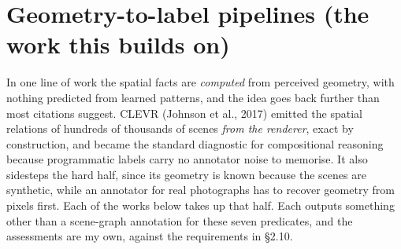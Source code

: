 \section{Geometry-to-label pipelines (the work this builds on)}

In one line of work the spatial facts are \textit{computed} from perceived geometry, with nothing predicted from learned patterns, and the idea goes back further than most citations suggest. CLEVR (Johnson et al., 2017) emitted the spatial relations of hundreds of thousands of scenes \textit{from the renderer}, exact by construction, and became the standard diagnostic for compositional reasoning because programmatic labels carry no annotator noise to memorise. It also sidesteps the hard half, since its geometry is known because the scenes are synthetic, while an annotator for real photographs has to recover geometry from pixels first. Each of the works below takes up that half. Each outputs something other than a scene-graph annotation for these seven predicates, and the assessments are my own, against the requirements in \S{}2.10.

